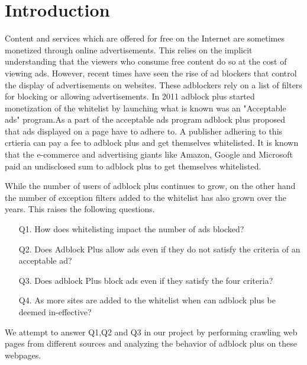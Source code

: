 \section{Introduction}
Content and services which are offered for free on the Internet are sometimes monetized through online advertisements.
This relies on the implicit understanding that the viewers who consume free content do so at the cost of viewing ads.
However, recent times have seen the  rise of ad blockers that control the display of  advertisements on websites. These adblockers rely on  a list of filters for blocking or allowing advertisements.
In 2011 adblock plus started monetization of the whitelist by launching what is known was an "Acceptable ads" program.As a part of the acceptable ads program adblock plus proposed  that ads  displayed on a page have to adhere to. A publisher adhering to this crtieria can pay a fee to adblock plus and get themselves whitelisted. It is known that the e-commerce and advertising giants like Amazon, Google and Microsoft paid an undisclosed sum to adblock plus to get themselves whitelisted.

While the number of users of adblock plus continues to grow, on the other hand the number of exception filters added to the whitelist has also grown over the years.
This raises the following questions.
\begin{itemize}
\item [Q1.] How does whitelisting impact the number of ads blocked? \label{q:q1}
\item [Q2.] Does Adblock Plus allow ads even if they do not satisfy the criteria of an acceptable ad? \label{q:q2}
\item [Q3.] Does adblock Plus block ads even if they satisfy the four criteria? \label{q:q3}
\item [Q4.] As more sites are added to the whitelist when can adblock plus be deemed in-effective? \label{q:q4}
\end{itemize}
We attempt to answer Q1,Q2 and Q3 in our project by performing crawling web pages from different sources and analyzing the behavior of adblock plus on these webpages.

